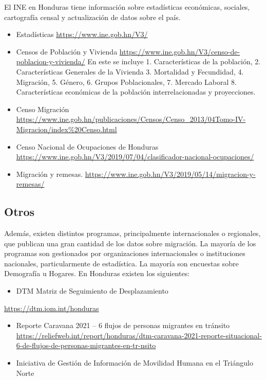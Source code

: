 \documentclass[
]{book}
\providecommand{\tightlist}{%
  \setlength{\itemsep}{0pt}\setlength{\parskip}{0pt}}
\begin{document}
El INE en Honduras tiene información sobre estadísticas económicas, sociales, cartografía censal y actualización de datos sobre el país.

\begin{itemize}
\item
  Estadísticas \url{https://www.ine.gob.hn/V3/}
\item
  Censos de Población y Vivienda \url{https://www.ine.gob.hn/V3/censo-de-poblacion-y-vivienda/} En este se incluye 1. Características de la población, 2. Características Generales de la Vivienda 3. Mortalidad y Fecundidad, 4. Migración, 5. Género, 6. Grupos Poblacionales, 7. Mercado Laboral 8. Características económicas de la población interrelacionadas y proyecciones.
\item
  Censo Migración \url{https://www.ine.gob.hn/publicaciones/Censos/Censo_2013/04Tomo-IV-Migracion/index\%20Censo.html}
\item
  Censo Nacional de Ocupaciones de Honduras \url{https://www.ine.gob.hn/V3/2019/07/04/clasificador-nacional-ocupaciones/}
\item
  Migración y remesas. \url{https://www.ine.gob.hn/V3/2019/05/14/migracion-y-remesas/}
\end{itemize}

\hypertarget{otros-1}{%
\subsection{Otros}\label{otros-1}}

Además, existen distintos programas, principalmente internacionales o regionales, que publican una gran cantidad de los datos sobre migración. La mayoría de los programas son gestionados por organizaciones internacionales o instituciones nacionales, particularmente de estadística. La mayoría son encuestas sobre Demografía u Hogares. En Honduras existen los siguientes:

\begin{itemize}
\tightlist
\item
  DTM Matriz de Seguimiento de Desplazamiento
\end{itemize}

\url{https://dtm.iom.int/honduras}

\begin{itemize}
\item
  Reporte Caravana 2021 -- 6 flujos de personas migrantes en tránsito \url{https://reliefweb.int/report/honduras/dtm-caravana-2021-reporte-situacional-6-de-flujos-de-personas-migrantes-en-tr-nsito}
\item
  Iniciativa de Gestión de Información de Movilidad Humana en el Triángulo Norte
\end{itemize}
\end{document}
